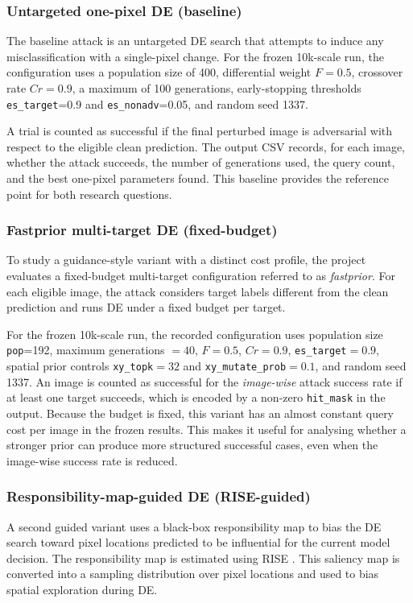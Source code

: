 \subsubsection{Untargeted one-pixel DE (baseline)}
The baseline attack is an untargeted DE search that attempts to induce any misclassification with a single-pixel change.
For the frozen 10k-scale run, the configuration uses a population size of 400, differential weight $F=0.5$, crossover rate $Cr=0.9$, a maximum of 100 generations, early-stopping thresholds \texttt{es\_target}=0.9 and \texttt{es\_nonadv}=0.05, and random seed 1337.

A trial is counted as successful if the final perturbed image is adversarial with respect to the eligible clean prediction.
The output CSV records, for each image, whether the attack succeeds, the number of generations used, the query count, and the best one-pixel parameters found.
This baseline provides the reference point for both research questions.

\subsubsection{Fastprior multi-target DE (fixed-budget)}
To study a guidance-style variant with a distinct cost profile, the project evaluates a fixed-budget multi-target configuration referred to as \emph{fastprior}.
For each eligible image, the attack considers target labels different from the clean prediction and runs DE under a fixed budget per target.

For the frozen 10k-scale run, the recorded configuration uses population size \texttt{pop}=192, maximum generations $=40$, $F=0.5$, $Cr=0.9$, \texttt{es\_target}$=0.9$, spatial prior controls \texttt{xy\_topk}$=32$ and \texttt{xy\_mutate\_prob}$=0.1$, and random seed 1337.
An image is counted as successful for the \emph{image-wise} attack success rate if at least one target succeeds, which is encoded by a non-zero \texttt{hit\_mask} in the output.
Because the budget is fixed, this variant has an almost constant query cost per image in the frozen results.
This makes it useful for analysing whether a stronger prior can produce more structured successful cases, even when the image-wise success rate is reduced.

\subsubsection{Responsibility-map-guided DE (RISE-guided)}
A second guided variant uses a black-box responsibility map to bias the DE search toward pixel locations predicted to be influential for the current model decision.
The responsibility map is estimated using RISE \cite{petsiuk2018rise}.
This saliency map is converted into a sampling distribution over pixel locations and used to bias spatial exploration during DE.

